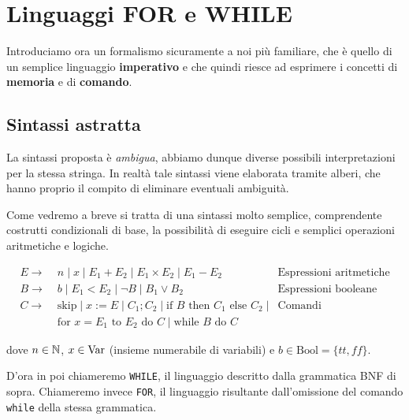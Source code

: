 \section{Linguaggi FOR e WHILE}
Introduciamo ora un formalismo sicuramente a noi più familiare,
che è quello di un semplice linguaggio \textbf{imperativo} e
che quindi riesce ad esprimere i concetti di \textbf{memoria}
e di \textbf{comando}.

\subsection{Sintassi astratta}
La sintassi proposta è \emph{ambigua}, abbiamo dunque diverse
possibili interpretazioni per la stessa stringa. In realtà
tale sintassi viene elaborata tramite alberi, che hanno proprio
il compito di eliminare eventuali ambiguità.

Come vedremo a breve si tratta di una sintassi molto semplice,
comprendente costrutti condizionali di base, la possibilità
di eseguire cicli e semplici operazioni aritmetiche e logiche.

\begin{align*}
	E \to                                                 &
	\; n \; | \; x \; | \; E_1 + E_2 \; | \;
	E_1 \times E_2 \; | \; E_1 - E_2
	                                                      &
	\text{Espressioni aritmetiche}                          \\
	B \to                                                 &
	\; b \; | \; E_1 < E_2 \; | \; \lnot B \; | \;
	B_1 \lor B_2
	                                                      &
	\text{Espressioni booleane}                             \\
	C\to                                                  &
	\; \text{skip} \; | \; x := E \; | \; C_1 ; C_2 \; | \;
	\text{if } B \text{ then } C_1 \text{ else } C_2 \; | &
	\text{Comandi}                                          \\ &
	\; \text{for } x = E_1 \text{ to } E_2 \text{ do } C \; |
	\; \text{while } B \text{ do } C
\end{align*}

dove $n \in \mathbb{N}$, $x \in \operatorname{Var}$ (insieme numerabile di
variabili) e $b \in \text{Bool} = \{ tt, ff \}$.

D'ora in poi chiameremo \verb|WHILE|, il linguaggio descritto
dalla grammatica BNF di sopra. Chiameremo invece \verb|FOR|,
il linguaggio risultante dall'omissione del comando \verb|while|
della stessa grammatica.

